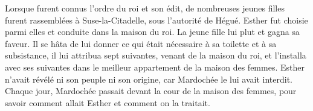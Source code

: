 Lorsque furent connus l’ordre du roi et son édit,
	de nombreuses jeunes filles furent rassemblées à Suse-la-Citadelle,
	sous l’autorité de Hégué.
Esther fut choisie parmi elles et conduite dans la maison du roi.
	La jeune fille lui plut et gagna sa faveur.
Il se hâta de lui donner ce qui était nécessaire à sa toilette et à sa subsistance,
	il lui attribua sept suivantes, venant de la maison du roi,
	et l’installa avec ses suivantes dans le meilleur appartement de la maison des femmes.
Esther n’avait révélé ni son peuple ni son origine, car Mardochée le lui avait interdit.
Chaque jour, Mardochée passait devant la cour de la maison des femmes,
	pour savoir comment allait Esther et comment on la traitait.
